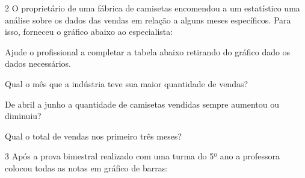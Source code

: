 
\num{2} O proprietário de uma fábrica de camisetas encomendou a um
estatístico uma análise sobre os dados das vendas em relação a alguns
meses específicos. Para isso, forneceu o gráfico abaixo ao especialista:


\begin{escolha}
\item
  Ajude o profissional a completar a tabela abaixo retirando do gráfico
  dado os dados necessários.


\item
  Qual o mês que a indústria teve sua maior quantidade de vendas?


\item
  De abril a junho a quantidade de camisetas vendidas sempre aumentou ou
  diminuiu?


\item
  Qual o total de vendas nos primeiro três meses?

\end{escolha}


\num{3} Após a prova bimestral realizado com uma turma do 5º ano a
professora colocou todas as notas em gráfico de barras:


